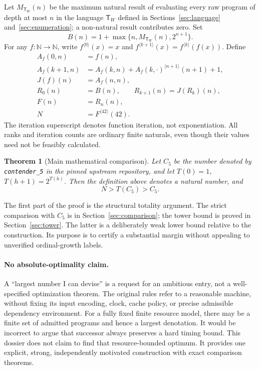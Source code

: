 \documentclass[11pt]{article}
\newtheorem{theorem}{Theorem}[section]
\theoremstyle{definition}
\newcommand{\N}{\mathbb N}
\newcommand{\TW}{\mathsf T_W}
\newcommand{\MW}{M_{\TW}}
\newcommand{\Cfive}{C_5}
\newcommand{\itf}[3]{#1^{\langle #2\rangle}(#3)}
\begin{document}
Let $\MW(n)$ be the maximum natural result of evaluating every raw program of
depth at most $n$ in the language $\TW$ defined in Sections~\ref{sec:language}
and~\ref{sec:enumeration}; a non-natural result contributes zero. Set
\begin{equation}\label{eq:seed-independent}
 B(n)=1+\max\{n,\MW(n),2^{n+1}\}.
\end{equation}
For any $f:\N\to\N$, write $\itf f0x=x$ and
$\itf f{k+1}x=\itf fk{f(x)}$. Define
\begin{align}
 A_f(0,n)&=f(n),\label{eq:rows0}\\
 A_f(k+1,n)&=A_f(k,n)+
       \itf{A_f(k,\cdot)}{n+1}{n+1}+1,\label{eq:rows}\\
 J(f)(n)&=A_f(n,n),\label{eq:jump}\\
 R_0(n)&=B(n),\qquad R_{k+1}(n)=J(R_k)(n),\label{eq:ranks}\\
 F(n)&=R_n(n),\label{eq:diagonal}\\
 N&=\boxed{\itf F{42}{42}}.\label{eq:entry}
\end{align}
The iteration superscript denotes function iteration, not exponentiation. All
ranks and iteration counts are ordinary finite naturals, even though their
values need not be feasibly calculated.

\begin{theorem}[Main mathematical comparison]\label{thm:main-intro}
Let $\Cfive$ be the number denoted by \texttt{contender\_5} in the pinned upstream
repository, and let $T(0)=1$, $T(h+1)=2^{T(h)}$. Then the definition above denotes
a natural number, and
\[
                     N>T(\Cfive)>\Cfive.
\]
\end{theorem}
The first part of the proof is the structural totality argument. The strict
comparison with $\Cfive$ is in Section~\ref{sec:comparison}; the tower bound is
proved in Section~\ref{sec:tower}. The latter is a deliberately weak lower bound
relative to the construction. Its purpose is to certify a substantial margin
without appealing to unverified ordinal-growth labels.

\paragraph{No absolute-optimality claim.}
A ``largest number I can devise'' is a request for an ambitious entry, not a
well-specified optimization theorem. The original rules refer to a reasonable
machine, without fixing its input encoding, clock, cache policy, or precise
admissible dependency environment. For a fully fixed finite resource model,
there may be a finite set of admitted programs and hence a largest denotation.
It would be incorrect to argue that successor always preserves a hard timing
bound. This dossier does not claim to find that resource-bounded optimum. It
provides one explicit, strong, independently motivated construction with exact
comparison theorems.
\end{document}
